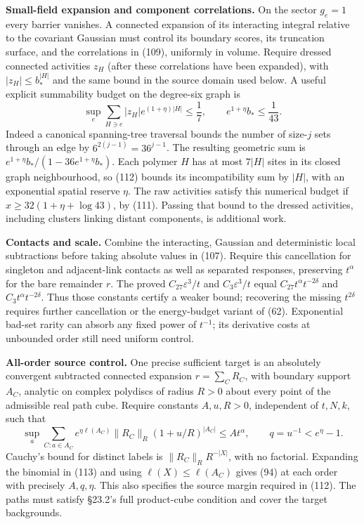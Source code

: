 \documentclass[11pt,a4paper]{article}
\begin{document}
\textbf{Small-field expansion and component correlations.} On the sector
\(g_e=1\) every barrier vanishes. A connected expansion of its
interacting integral relative to the covariant Gaussian must control its
boundary scores, its truncation surface, and the correlations in (109),
uniformly in volume. Require dressed connected activities \(z_H\) (after
these correlations have been expanded), with \(|z_H|\le b_*^{|H|}\) and
the same bound in the source domain used below. A useful explicit
summability budget on the degree-six graph is
\[\sup_e\sum_{H\ni e}|z_H|e^{(1+\eta)|H|}\le\frac17,
\qquad e^{1+\eta}b_*\le\frac1{43}.\tag{112}\] Indeed a canonical
spanning-tree traversal bounds the number of size-\(j\) sets through an
edge by \(6^{2(j-1)}=36^{j-1}\). The resulting geometric sum is
\(e^{1+\eta}b_* /(1-36e^{1+\eta}b_*)\). Each polymer \(H\) has at most
\(7|H|\) sites in its closed graph neighbourhood, so (112) bounds its
incompatibility sum by \(|H|\), with an exponential spatial reserve
\(\eta\). The raw activities satisfy this numerical budget if
\(x\ge32(1+\eta+\log43)\), by (111). Passing that bound to the dressed
activities, including clusters linking distant components, is additional
work.

\textbf{Contacts and scale.} Combine the interacting, Gaussian and
deterministic local subtractions before taking absolute values in (107).
Require this cancellation for singleton and adjacent-link contacts as
well as separated responses, preserving \(t^\alpha\) for the bare
remainder \(r\). The proved \(C_{27}\varepsilon^3/t\) and
\(C_3\varepsilon^3/t\) equal \(C_{27}t^\alpha t^{-2\delta}\) and
\(C_3t^\alpha t^{-2\delta}\). Thus those constants certify a weaker
bound; recovering the missing \(t^{2\delta}\) requires further
cancellation or the energy-budget variant of (62). Exponential bad-set
rarity can absorb any fixed power of \(t^{-1}\); its derivative costs at
unbounded order still need uniform control.

\textbf{All-order source control.} One precise sufficient target is an
absolutely convergent subtracted connected expansion \(r=\sum_C R_C\),
with boundary support \(A_C\), analytic on complex polydiscs of radius
\(R>0\) about every point of the admissible real path cube. Require
constants \(A,u,R>0\), independent of \(t,N,k\), such that
\[\sup_a\sum_{C:a\in A_C}e^{\eta\ell(A_C)}
 \|R_C\|_R(1+u/R)^{|A_C|}\le At^\alpha,
 \qquad q=u^{-1}<e^\eta-1.\tag{113}\] Cauchy's bound for distinct labels
is \(\|R_C\|_R R^{-|X|}\), with no factorial. Expanding the binomial in
(113) and using \(\ell(X)\le\ell(A_C)\) gives (94) at each order with
precisely \(A,q,\eta\). This also specifies the source margin required
in (112). The paths must satisfy §23.2's full product-cube condition and
cover the target backgrounds.
\end{document}
